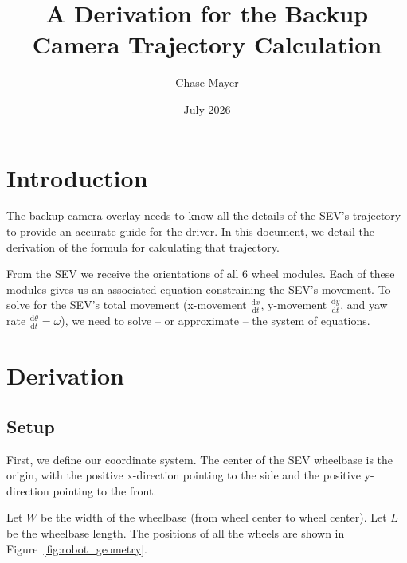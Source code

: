 \documentclass{article}
\title{A Derivation for the Backup Camera Trajectory Calculation}
\author{Chase Mayer}
\date{July 2026}
\begin{document}
\newcommand{\dxdt}{\frac{\mathrm{d}x}{\mathrm{d}t}}
\newcommand{\dydt}{\frac{\mathrm{d}y}{\mathrm{d}t}}

\lstset{style=mystyle}

\maketitle

\section{Introduction}

The backup camera overlay needs to know all the details of the SEV's trajectory to provide an accurate guide for the driver. In this document, we detail the derivation of the formula for calculating that trajectory.

From the SEV we receive the orientations of all 6 wheel modules. Each of these modules gives us an associated equation constraining the SEV's movement. To solve for the SEV's total movement (x-movement $\dxdt$, y-movement $\dydt$, and yaw rate $\frac{\mathrm{d}\theta}{\mathrm{d}t}=\omega$), we need to solve -- or approximate -- the system of equations.

\section{Derivation}
\subsection{Setup}

First, we define our coordinate system. The center of the SEV wheelbase is the origin, with the positive x-direction pointing to the side and the positive y-direction pointing to the front.

Let $W$ be the width of the wheelbase (from wheel center to wheel center). Let $L$ be the wheelbase length. The positions of all the wheels are shown in Figure~\ref{fig:robot_geometry}.
\end{document}
